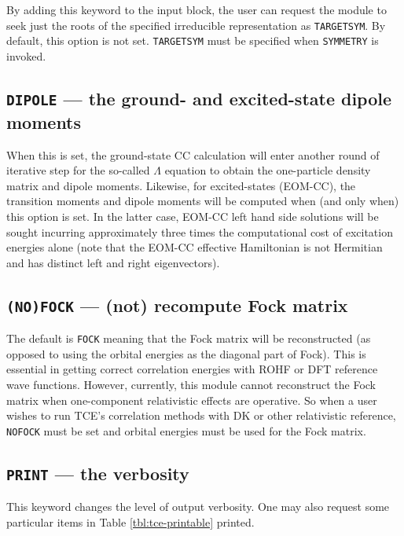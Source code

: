 By adding this keyword to the input block, the user can request the module to
seek just the roots of the specified irreducible representation as 
\verb+TARGETSYM+.  By default, this option is not set.
\verb+TARGETSYM+ must be specified when \verb+SYMMETRY+ is invoked.

\subsection{{\tt DIPOLE} --- the ground- and excited-state dipole moments}

When this is set, the ground-state CC calculation will enter another round 
of iterative step for the so-called $\Lambda$ equation to obtain the one-particle
density matrix and dipole moments.  Likewise, for excited-states (EOM-CC), the 
transition moments and dipole moments will be computed when (and only when) this
option is set.  In the latter case, EOM-CC left hand side solutions will be sought
incurring approximately three times the computational cost of excitation energies 
alone (note that the EOM-CC effective Hamiltonian is not Hermitian and has distinct
left and right eigenvectors).

\subsection{{\tt (NO)FOCK} --- (not) recompute Fock matrix}

The default is \verb+FOCK+ meaning that the Fock matrix will
be reconstructed (as opposed to using the orbital energies as the diagonal part of
Fock).  This is essential in getting correct correlation energies with ROHF or DFT
reference wave functions.  However, currently, this module cannot reconstruct the
Fock matrix when one-component relativistic effects are operative.  So when a user
wishes to run TCE's correlation methods with DK or other relativistic reference,
\verb+NOFOCK+ must be set and orbital energies must be used for the Fock matrix.

\subsection{{\tt PRINT} --- the verbosity}

This keyword changes the level of output verbosity.  One may also
request some particular items in Table \ref{tbl:tce-printable} printed.

